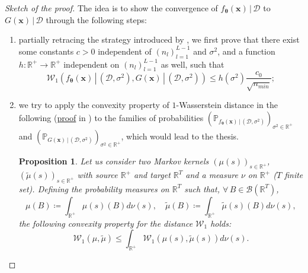 \documentclass[a4paper, 11pt, reqno]{amsart}
\newcommand{\citet}[2][]{\citeauthor{#2} \cite[#1]{#2}}
\theoremstyle{plain}
\newtheorem{proposition}[theorem]{Proposition}
\theoremstyle{remark}
\theoremstyle{definition}
\newcommand{\given}{\, | \,}
\newcommand{\wass}[3][2]{\mathcal{W}_{#1}\left(#2, #3\right)}
\newcommand{\real}{\mathbb{R}}
\newcommand{\borel}[1]{\mathcal{B}\left(#1\right)}
\let\oldforall\forall
\renewcommand{\forall}{\oldforall\,}
\newcommand{\train}{\mathcal{D}}
\begin{document}
\begin{proof}[Sketch of the proof] 
    The idea is to show the convergence of $f_{\bm{\theta}}(\bm{x}) \given \train$ to $G(\bm{x}) \given \train$ through the following steps: 
    \begin{enumerate}
        \item partially retracing the strategy introduced by \citet{trevisan2023}, we first prove that there exist some constants $c > 0$ independent of $\left(n_l\right)_{l = 1}^{L - 1}$ and $\sigma^2$, and a function $h: \real^+ \to \real^+$ independent on $\left(n_l\right)_{l = 1}^{L - 1}$ as well, such that
        \begin{equation} \label{eq:simpleconvposteriorsigma}
            \wass[1]{f_{\bm{\theta}}(\bm{x}) \given (\train, \sigma^2)}{G(\bm{x}) \given (\train, \sigma^2)} \leq h(\sigma^2) \frac{c_0}{\sqrt{n_{min}}};
        \end{equation}
        \item we try to apply the convexity property of $1$-Wasserstein distance in the following  (\hyperlink{proof:wassconvexity}{proof} in ) to the families of probabilities $\left(\mathbb{P}_{f_{\bm{\theta}}(\bm{x}) \given (\train, \sigma^2)}\right)_{\sigma^2 \in \real^+}$ and $\left(\mathbb{P}_{G(\bm{x}) \given (\train, \sigma^2)}\right)_{\sigma^2 \in \real^+}$, which would lead to the thesis.
        \begin{proposition} \label{prop:wassconvexity}
            Let us consider two Markov kernels $(\mu(s))_{s \in \real^+}$, $(\widetilde{\mu}(s))_{s \in \real^+}$ with source $\real^+$ and target $\real^T$ and a measure $\nu$ on $\real^+$ ($T$ finite set).
            Defining the probability measures on $\real^T$ such that, $\forall B \in \borel{\real^T}$,
            \begin{equation*}
                \mu(B) \coloneqq \int_{\real^+} \mu(s)(B) d\nu(s), \quad \widetilde{\mu}(B) \coloneqq \int_{\real^+} \widetilde{\mu}(s)(B) d\nu(s),
            \end{equation*}
            the following convexity property for the distance $\mathcal{W}_1$ holds: 
            \begin{equation} \label{eq:wassconvex}
                \wass[1]{\mu}{\widetilde{\mu}} \leq \int_{\real^+} \wass[1]{\mu(s)}{\widetilde{\mu}(s)} d\nu(s).
            \end{equation}

\end{proposition}
\end{enumerate}
\end{proof}
\end{document}
